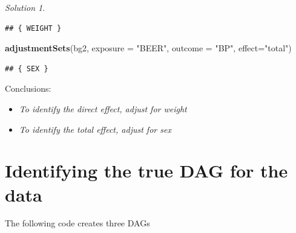 \documentclass[
]{book}
\newenvironment{Shaded}{\begin{snugshade}}{\end{snugshade}}
\newcommand{\AttributeTok}[1]{\textcolor[rgb]{0.13,0.29,0.53}{#1}}
\newcommand{\FunctionTok}[1]{\textcolor[rgb]{0.13,0.29,0.53}{\textbf{#1}}}
\newcommand{\NormalTok}[1]{#1}
\newcommand{\StringTok}[1]{\textcolor[rgb]{0.31,0.60,0.02}{#1}}
\providecommand{\tightlist}{%
  \setlength{\itemsep}{0pt}\setlength{\parskip}{0pt}}
\theoremstyle{definition}
\theoremstyle{definition}
\theoremstyle{definition}
\theoremstyle{definition}
\theoremstyle{remark}
\newtheorem*{solution}{Solution}
\begin{document}
\begin{solution}
\begin{verbatim}
## { WEIGHT }
\end{verbatim}

\begin{Shaded}
\begin{Highlighting}[]
\FunctionTok{adjustmentSets}\NormalTok{(bg2, }\AttributeTok{exposure =} \StringTok{"BEER"}\NormalTok{, }\AttributeTok{outcome =} \StringTok{"BP"}\NormalTok{, }\AttributeTok{effect=}\StringTok{"total"}\NormalTok{)}
\end{Highlighting}
\end{Shaded}

\begin{verbatim}
## { SEX }
\end{verbatim}

Conclusions:

\begin{itemize}
\tightlist
\item
  \emph{To identify the direct effect, adjust for weight}
\item
  \emph{To identify the total effect, adjust for sex}
\end{itemize}

\end{solution}

\section{Identifying the true DAG for the data}\label{identifying-the-true-dag-for-the-data}

The following code creates three DAGs
\end{document}
